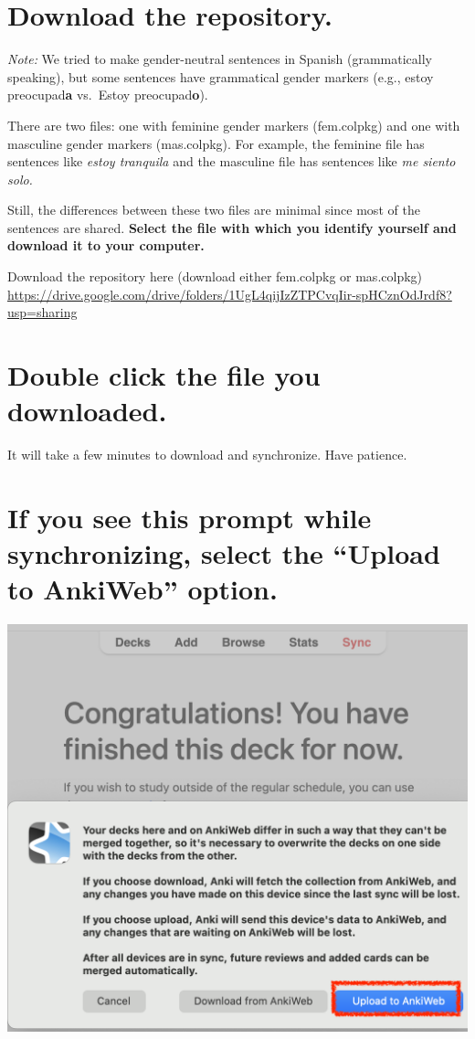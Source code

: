 \documentclass[
]{book}
\begin{document}
\hypertarget{download-the-repository.}{%
\section{Download the repository.}\label{download-the-repository.}}

\emph{Note:} We tried to make gender-neutral sentences in Spanish (grammatically speaking), but some sentences have grammatical gender markers (e.g., estoy preocupad\textbf{a} vs.~Estoy preocupad\textbf{o}).

There are two files: one with feminine gender markers (fem.colpkg) and one with masculine gender markers (mas.colpkg). For example, the feminine file has sentences like \emph{estoy tranquila} and the masculine file has sentences like \emph{me siento solo.}

Still, the differences between these two files are minimal since most of the sentences are shared. \textbf{Select the file with which you identify yourself and download it to your computer.}

Download the repository here (download either fem.colpkg or mas.colpkg) \url{https://drive.google.com/drive/folders/1UgL4qijIzZTPCvqIir-spHCznOdJrdf8?usp=sharing}

\hypertarget{double-click-the-file-you-downloaded.}{%
\section{Double click the file you downloaded.}\label{double-click-the-file-you-downloaded.}}

It will take a few minutes to download and synchronize. Have patience.

\hypertarget{if-you-see-this-prompt-while-synchronizing-select-the-upload-to-ankiweb-option.}{%
\section*{If you see this prompt while synchronizing, select the ``Upload to AnkiWeb'' option.}\label{if-you-see-this-prompt-while-synchronizing-select-the-upload-to-ankiweb-option.}}

\includegraphics[width=0.6\linewidth]{images/reposit_en/subir_a_anki}
\end{document}
